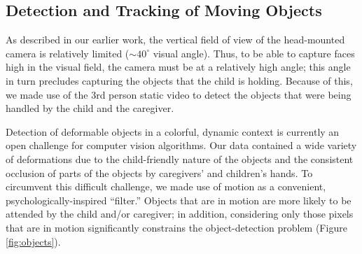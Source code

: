 \documentclass[10pt,letterpaper]{article}
\begin{document}

\subsection{Detection and Tracking of Moving Objects}

As described in our earlier work, the vertical field of view of the head-mounted camera is relatively limited ($\sim40^\circ$ visual angle). Thus, to be able to capture faces high in the visual field, the camera must be at a relatively high angle; this angle in turn precludes capturing the objects that the child is holding. Because of this, we made use of the 3rd person static video to detect the objects that were being handled by the child and the caregiver. 



Detection of deformable objects in a colorful, dynamic context is currently an open challenge for computer vision algorithms. Our data contained a wide variety of deformations due to the child-friendly nature of the objects and the consistent occlusion of parts of the objects by caregivers' and children's hands.  To circumvent this difficult challenge, we made use of motion as a convenient, psychologically-inspired ``filter.'' Objects that are in motion are more likely to be attended by the child and/or caregiver; in addition, considering only those pixels that are in motion significantly constrains the object-detection problem (Figure \ref{fig:objects}). 
\end{document}
